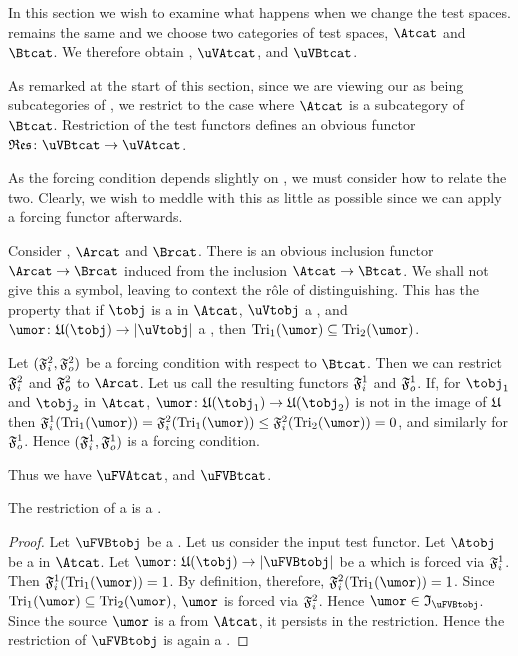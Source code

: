 \documentclass[%
12pt,%
arxiv,%
defaults
]{myclass}
\begin{document}
In this section we wish to examine what happens when we change the test spaces.
\ucatu remains the same and we choose two categories of test spaces, \(\Atcat\) and \(\Btcat\).
We therefore obtain \uVAtcat, \(\uVAtcat\), and \(\uVBtcat\).

As remarked at the start of this section, since we are viewing our \tcats as being subcategories of \mcat, we restrict to the case where \(\Atcat\) is a subcategory of \(\Btcat\).
Restriction of the test functors defines an obvious functor \(\resfunc \colon \uVBtcat \to \uVAtcat\).

As the forcing condition depends slightly on \tcat, we must consider how to relate the two.
Clearly, we wish to meddle with this as little as possible since we can apply a forcing functor afterwards.

Consider \rcats, \(\Arcat\) and \(\Brcat\).
There is an obvious inclusion functor \(\Arcat \to \Brcat\) induced from the inclusion \(\Atcat \to \Btcat\).
We shall not give this a symbol, leaving to context the r\^ole of distinguishing.
This has the property that if \(\tobj\) is a \tobj in \(\Atcat\), \(\uVtobj\) a \uVtobj, and \(\umor \colon \ufunc(\tobj) \to \forfunc[\uVtobj]\) a \umor, then \(\trials[_1]{\umor} \subseteq \trials[_2]{\umor}\).

Let \((\iforce^2, \oforce^2)\) be a forcing condition with respect to \(\Btcat\).
Then we can restrict \(\iforce^2\) and \(\oforce^2\) to \(\Arcat\).
Let us call the resulting functors \(\iforce^1\) and \(\oforce^1\).
If, for \(\tobj_1\) and \(\tobj_2\) in \(\Atcat\), \(\umor \colon \ufunc(\tobj_1) \to \ufunc(\tobj_2)\) is not in the image of \(\ufunc\) then \(\iforce^1(\trials[_1]{\umor}) = \iforce^2(\trials[_1]{\umor}) \le \iforce^2(\trials[_2]{\umor}) = 0\), and similarly for \(\oforce^1\).
Hence \((\iforce^1, \oforce^1)\) is a forcing condition.

Thus we have \(\uFVAtcat\), and \(\uFVBtcat\).

\begin{proposition}
The restriction of a \uFVBtobj is a \uFVAtobj.
\end{proposition}

\begin{proof}
Let \(\uFVBtobj\) be a \uFVBtobj.
Let us consider the input test functor.
Let \(\Atobj\) be a \Atobj in \(\Atcat\).
Let \(\umor \colon \ufunc(\tobj) \to \forfunc[\uFVBtobj]\) be a \umor which is forced via \(\iforce^1\).
Then \(\iforce^1(\trials[_1]{\umor}) = 1\).
By definition, therefore, \(\iforce^2(\trials[_1]{\umor}) = 1\).
Since \(\trials[_1]{\umor} \subseteq \trials[_2]{\umor}\), \(\umor\) is forced via \(\iforce^2\).
Hence \(\umor \in \itest_{\uFVBtobj}\).
Since the source \(\umor\) is a \Atobj from \(\Atcat\), it persists in the restriction.
Hence the restriction of \(\uFVBtobj\) is again a \uFVAtobj.
\end{proof}
\end{document}
